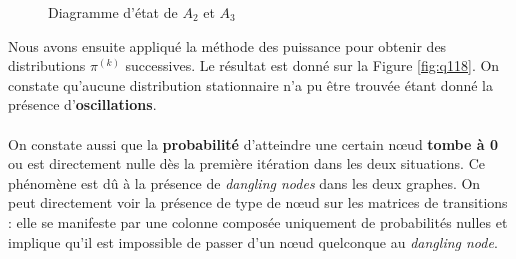\documentclass[a4paper,titlepage]{report}
\begin{document}
\begin{figure}[h]
	\center
	\caption{Diagramme d'état de $A_2$ et $A_3$}
	\label{fig:Q23}
\end{figure} 
Nous avons ensuite appliqué la méthode des puissance pour obtenir des distributions $\pi^{(k)}$ successives. Le résultat est donné sur la Figure \ref{fig:q118}. On constate qu'aucune distribution stationnaire n'a pu être trouvée étant donné la présence d'\textbf{oscillations}.
\paragraph{}
On constate aussi que la \textbf{probabilité} d'atteindre une certain nœud \textbf{tombe à 0} ou est directement nulle dès la première itération dans les deux situations. Ce phénomène est dû à la présence de \textit{dangling nodes} dans les deux graphes. On peut directement voir la présence de type de nœud sur les matrices de transitions :  elle se manifeste par une colonne composée uniquement de probabilités nulles et implique qu'il est impossible de passer d'un nœud quelconque au \textit{dangling node}.
\end{document}

